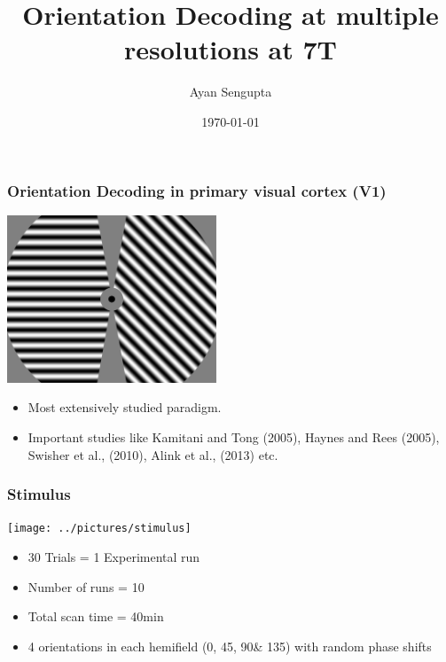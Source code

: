 \documentclass{beamer}
\title{Orientation Decoding at multiple resolutions at 7T}
\author{Ayan Sengupta\inst{1}}
\institute[Affiliations] %
{
  \inst{1}%
  Institute of Experimental Psychology\\
  Otto-von-Guericke University\\
  Magdeburg
}
\date{\today}
\begin{document}
\frame{\titlepage}
  \begin{frame}
    \frametitle{Orientation Decoding in primary visual cortex (V1)}
    \begin{center}
        \includegraphics[height=5cm]{../pictures/exp_frame}
    \end{center}
    \begin{itemize}
        \item Most extensively studied paradigm.
        \item Important studies like Kamitani and Tong (2005), Haynes and Rees (2005),
        Swisher et al., (2010), Alink et al., (2013) etc.
    \end{itemize}
  \end{frame}
    \begin{frame}
        \frametitle{Stimulus}
            \begin{center}
                \texttt{[image: ../pictures/stimulus]}
            \end{center}
            \begin{itemize}
                \item 30 Trials = 1 Experimental run
                \item Number of runs = 10
                \item Total scan time = 40min
                \item 4 orientations in each hemifield (0\textdegree, 45\textdegree, 90\textdegree \& 135\textdegree) with random phase shifts
            \end{itemize}

    \end{frame}
 
\end{document}

